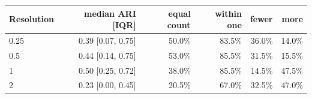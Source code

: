 \begin{tabular}{lrrrrr}
\toprule
Resolution & median ARI [IQR] & equal count & within one & fewer & more \\
\midrule
0.25 & 0.39 [0.07, 0.75] & 50.0\% & 83.5\% & 36.0\% & 14.0\% \\
0.5 & 0.44 [0.14, 0.75] & 53.0\% & 85.5\% & 31.5\% & 15.5\% \\
1 & 0.50 [0.25, 0.72] & 38.0\% & 85.5\% & 14.5\% & 47.5\% \\
2 & 0.23 [0.00, 0.45] & 20.5\% & 67.0\% & 32.5\% & 47.0\% \\
\bottomrule
\end{tabular}
